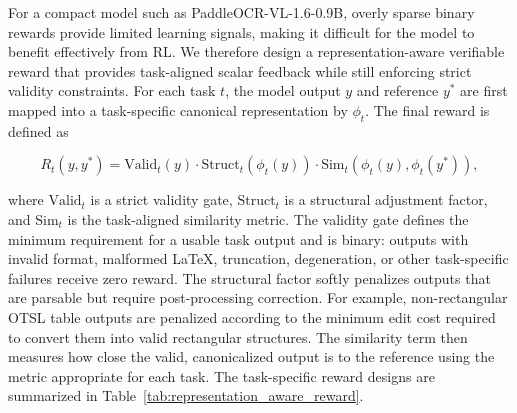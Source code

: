 \documentclass[11pt, a4paper,logo,  copyright, nonumbering]{paddleocr}
\begin{document}
For a compact model such as PaddleOCR-VL-1.6-0.9B, overly sparse binary rewards provide limited learning signals, making it difficult for the model to benefit effectively from RL. We therefore design a representation-aware verifiable reward that provides task-aligned scalar feedback while still enforcing strict validity constraints. For each task $t$, the model output $y$ and reference $y^*$ are first mapped into a task-specific canonical representation by $\phi_t$. The final reward is defined as

\begin{equation}
R_t(y, y^*) =
\mathrm{Valid}_t(y)
\cdot
\mathrm{Struct}_t(\phi_t(y))
\cdot
\mathrm{Sim}_t(\phi_t(y), \phi_t(y^*)),
\label{eq:representation_aware_reward}
\end{equation}

where $\mathrm{Valid}_t$ is a strict validity gate, $\mathrm{Struct}_t$ is a structural adjustment factor, and $\mathrm{Sim}_t$ is the task-aligned similarity metric. The validity gate defines the minimum requirement for a usable task output and is binary: outputs with invalid format, malformed LaTeX, truncation, degeneration, or other task-specific failures receive zero reward. The structural factor softly penalizes outputs that are parsable but require post-processing correction. For example, non-rectangular OTSL table outputs are penalized according to the minimum edit cost required to convert them into valid rectangular structures. The similarity term then measures how close the valid, canonicalized output is to the reference using the metric appropriate for each task. The task-specific reward designs are summarized in Table~\ref{tab:representation_aware_reward}.
\end{document}
